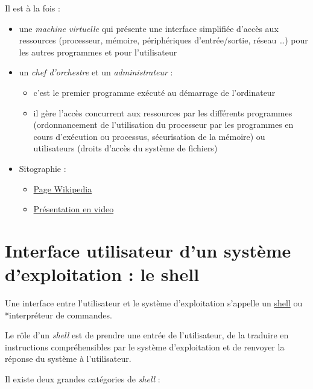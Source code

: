 \documentclass[
  11pt,
]{article}
\providecommand{\tightlist}{%
  \setlength{\itemsep}{0pt}\setlength{\parskip}{0pt}}
\newcounter{cours}
\newcounter{prog}
\begin{document}
Il est à la fois :

\begin{itemize}
\item
  une \emph{machine virtuelle} qui présente une interface simplifiée
  d'accès aux ressources (processeur, mémoire, périphériques
  d'entrée/sortie, réseau \ldots) pour les autres programmes et pour
  l'utilisateur
\item
  un \emph{chef d'orchestre} et un \emph{administrateur} :

  \begin{itemize}
  \tightlist
  \item
    c'est le premier programme exécuté au démarrage de l'ordinateur
  \item
    il gère l'accès concurrent aux ressources par les différents
    programmes (ordonnancement de l'utilisation du processeur par les
    programmes en cours d'exécution ou processus, sécurisation de la
    mémoire) ou utilisateurs (droits d'accès du système de fichiers)
  \end{itemize}
\item
  Sitographie :

  \begin{itemize}
  \tightlist
  \item
    \href{https://fr.wikipedia.org/wiki/Syst\%C3\%A8me_d\%27exploitation}{Page
    Wikipedia}
  \item
    \href{https://www.lumni.fr/video/comprendre-ce-qu-est-un-systeme-d-exploitation}{Présentation
    en video}
  \end{itemize}
\end{itemize}

\hypertarget{interface-utilisateur-dun-systuxe8me-dexploitation-le-shell}{%
\section{Interface utilisateur d'un système d'exploitation : le
shell}\label{interface-utilisateur-dun-systuxe8me-dexploitation-le-shell}}

Une interface entre l'utilisateur et le système d'exploitation s'appelle
un \href{https://fr.wikipedia.org/wiki/Shell_Unix}{shell} ou
*interpréteur de commandes.

Le rôle d'un \emph{shell} est de prendre une entrée de l'utilisateur, de
la traduire en instructions compréhensibles par le système
d'exploitation et de renvoyer la réponse du système à l'utilisateur.

Il existe deux grandes catégories de \emph{shell} :
\end{document}
